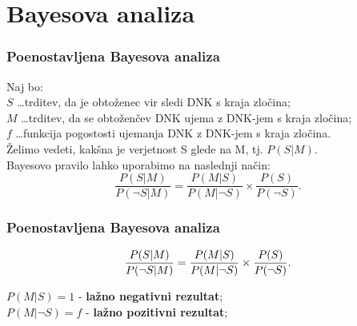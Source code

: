 \documentclass{beamer}
\begin{document}
\section{Bayesova analiza}

\begin{frame}
    \frametitle{Poenostavljena Bayesova analiza}
    Naj bo:\\
    $S$ \dots trditev, da je obtoženec vir sledi DNK s kraja zločina; \\
    $M$ \dots trditev, da se obtoženčev DNK ujema z DNK-jem s kraja zločina; \\
    $f$ \dots funkcija pogostosti ujemanja DNK z DNK-jem s kraja zločina. \\
    Želimo vedeti, kakšna je verjetnost S glede na M, tj. $P(S \lvert M)$. \\ \vspace{3mm}
    Bayesovo pravilo lahko uporabimo na naslednji način:
    \[
        \frac{P(S \lvert M)}{P(\neg S \lvert M)} = \frac{P(M \lvert S)}{P(M \lvert \neg S)} \times \frac{P(S)}{P(\neg S)}.
    \] 
\end{frame} 

\begin{frame}
    \frametitle{Poenostavljena Bayesova analiza}
    \[
        \frac{P(S \lvert M)}{P(\neg S \lvert M)} = \frac{P(M \lvert S)}{P(M \lvert \neg S)} \times \frac{P(S)}{P(\neg S)}. \vspace{3mm}
    \] 
    \begin{block}{}
        \centering
        $P(M \lvert S) = 1$ - \textbf{lažno negativni rezultat};\\ \vspace{2mm}
        $P(M \lvert \neg S) = f$ - \textbf{lažno pozitivni rezultat}; 
    \end{block}
\end{frame}
\end{document}
